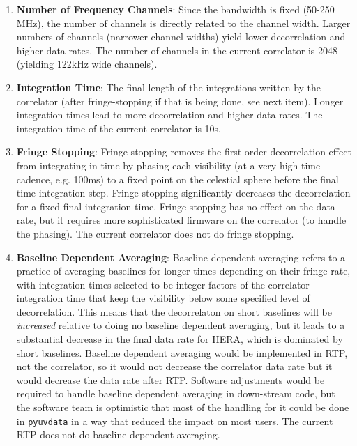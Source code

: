 \documentclass{article}
\begin{document}
\begin{enumerate}
\item \textbf{Number of Frequency Channels}: Since the bandwidth is fixed (50-250 MHz), the number of channels is directly related to the channel width. Larger numbers of channels (narrower channel widths) yield lower decorrelation and higher data rates. The number of channels in the current correlator is 2048 (yielding 122kHz wide channels).
\item \textbf{Integration Time}: The final length of the integrations written by the correlator (after fringe-stopping if that is being done, see next item). Longer integration times lead to more decorrelation and higher data rates. The integration time of the current correlator is 10s.
\item \textbf{Fringe Stopping}: Fringe stopping removes the first-order decorrelation effect from integrating in time by phasing each visibility (at a very high time cadence, e.g. 100ms) to a fixed point on the celestial sphere before the final time integration step. Fringe stopping significantly decreases the decorrelation for a fixed final integration time. Fringe stopping has no effect on the data rate, but it requires more sophisticated firmware on the correlator (to handle the phasing). The current correlator does not do fringe stopping.
\item \textbf{Baseline Dependent Averaging}: Baseline dependent averaging refers to a practice of averaging baselines for longer times depending on their fringe-rate, with integration times selected to be integer factors of the correlator integration time that keep the visibility below some specified level of decorrelation. This means that the decorrelaton on short baselines will be \textit{increased} relative to doing no baseline dependent averaging, but it leads to a substantial decrease in the final data rate for HERA, which is dominated by short baselines. Baseline dependent averaging would be implemented in RTP, not the correlator, so it would not decrease the correlator data rate but it would decrease the data rate after RTP. Software adjustments would be required to handle baseline dependent averaging in down-stream code, but the software team is optimistic that most of the handling for it could be done in \texttt{pyuvdata} in a way that reduced the impact on most users. The current RTP does not do baseline dependent averaging.
\end{enumerate}
\end{document}
